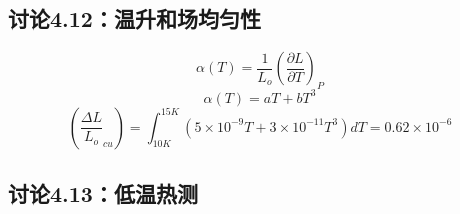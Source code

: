 \subsection{讨论4.12：温升和场均匀性}
\begin{equation}%
\alpha(T)=\frac{1}{L_o}(\frac{\partial L}{\partial T})_P
\end{equation}
\begin{equation}%
\alpha(T)=aT+bT^3
\end{equation}
\begin{equation}%
(\frac{\Delta L}{L_o}_{cu})=\int_{10K}^{15K}(5\times10^{-9}T+3\times10^{-11}T^3)dT=0.62\times10^{-6}
\end{equation}



\subsection{讨论4.13：低温热测}




